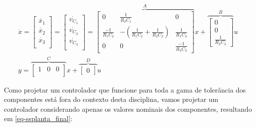 \documentclass[
	12pt,				%
	article,			%
	openright,			%
	oneside,
	a4paper,			%
	chapter=TITLE,		%
	section=TITLE,		%
	english,			%
	french,				%
	spanish,			%
	brazil,				%
]{abntex2}
\begin{document}
        	\begin{eqnarray}
        	    \nonumber
                \dot{x} = 
                \begin{bmatrix}
                    \dot{x_1} \\
                    \dot{x_2} \\
                    \dot{x_3} \\
                \end{bmatrix} = 
                \begin{bmatrix}
                    \dot{v_{C_1}} \\
                    \dot{v_{C_2}} \\
                    \dot{v_{C_3}} \\
                \end{bmatrix} =
                \overbrace{
                    \begin{bmatrix}
                        0 & \frac{1}{R_2 C_1} & 0 \\
                        \frac{-1}{R_1 C_2} & -\left( \frac{1}{R_1 C_2} + \frac{1}{R_2 C_2} \right) & \frac{1}{R_1 C_2} \\
                        0 & 0 & \frac{-1}{R_3 C_3}
                    \end{bmatrix}}^{A} x
                +
                \overbrace{
                    \begin{bmatrix}
                        0 \\
                        0 \\
                        \frac{1}{R_3 C_3}
                    \end{bmatrix}}^{B} u \\
                \label{eq-ssplanta}
                y = 
                \overbrace{
                    \begin{bmatrix}
                        1 & 0 & 0 \\
                    \end{bmatrix}}^{C} x
                +
                \overbrace{
                    \begin{bmatrix}
                        0
                    \end{bmatrix}}^{D} u
            \end{eqnarray}
        	
        	Como projetar um controlador que funcione para toda a gama de tolerância dos componentes está fora do contexto desta disciplina, vamos projetar um controlador considerando apenas os valores nominais dos componentes, resultando em \ref{eq-ssplanta_final}:
        	
\end{document}
